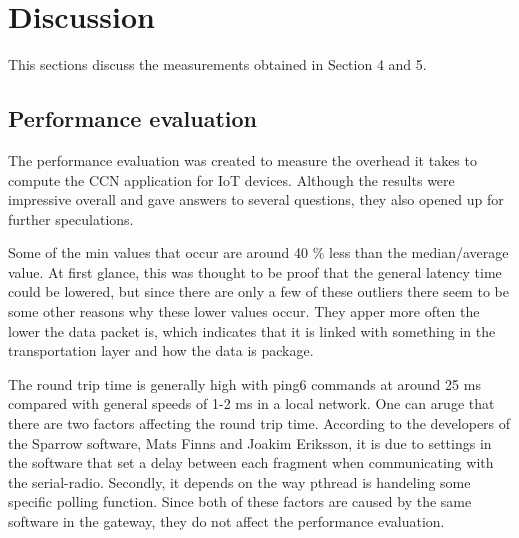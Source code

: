 \section{Discussion}
This sections discuss the measurements obtained in Section 4 and 5. %

\subsection{Performance evaluation}
The performance evaluation was created to measure the overhead it takes to compute the CCN application for IoT devices. Although the results were impressive overall and gave answers to several questions, they also opened up for further speculations.

Some of the min values that occur are around 40 $\%$ less than the median/average value. At first glance, this was thought to be proof that the general latency time could be lowered, but since there are only a few of these outliers there seem to be some other reasons why these lower values occur. They apper more often the lower the data packet is, which indicates that it is linked with something in the transportation layer and how the data is package.
%

The round trip time is generally high with ping6 commands at around 25 ms compared with general speeds of 1-2 ms in a local network. One can aruge that there are two factors affecting the round trip time. According to the developers of the Sparrow software, Mats Finns and Joakim Eriksson, it is due to settings in the software that set a delay between each fragment when communicating with the serial-radio. Secondly, it depends on the way pthread is handeling some specific polling function. Since both of these factors are caused by the same software in the gateway, they do not affect the performance evaluation.

